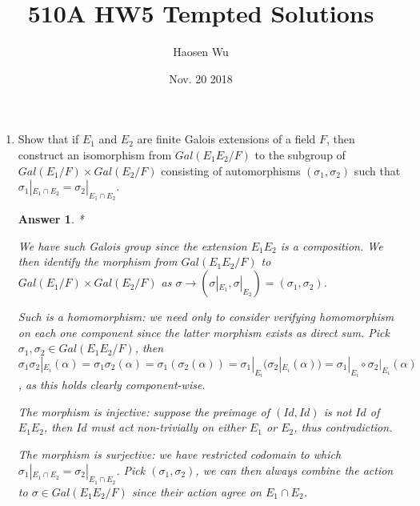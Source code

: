 \documentclass[11pt,leqno]{article}
\newcommand{\<}[1]{{\langle}#1 {\rangle}}
\theoremstyle{plain}
\newtheorem*{answer*}{Answer}
\theoremstyle{definition}
\theoremstyle{remark}
\numberwithin{equation}{section}
\begin{document}
\pagestyle{fancy}
\renewcommand{\sectionmark}[1]{\markright{\thesection\ #1}}
\fancyhead{}
\fancyhead[LO,R]{\bfseries\footnotesize\thepage}
\fancyhead[LE]{\bfseries\footnotesize\rightmark}
\fancyhead[RO]{\bfseries\footnotesize\rightmark}
\chead[]{}
\cfoot[]{}
\setlength{\headheight}{1cm}

\author{Haosen Wu}
\title{{\bf 510A HW5 Tempted Solutions}}
\date{Nov. 20 2018}

\maketitle
\begin{enumerate}

\item Show that if $E_1$ and $E_2$ are finite Galois extensions of a field $F$, then construct an isomorphism from $Gal(E_1E_2/F)$ to the subgroup of $Gal(E_1/F) \times Gal(E_2/F)$ consisting of automorphisms $(\sigma_1,\sigma_2)$ such that $\sigma_1 |_{E_1 \cap E_2} = \sigma_2|_{E_1 \cap E_2}$. 

\begin{answer*}*

    We have such Galois group since the extension $E_1E_2$ is a composition. We then identify the morphism from $Gal(E_1E_2/F)$ to $Gal(E_1/F) \times Gal(E_2/F)$ as $\sigma \rightarrow (\sigma |_{E_1}, \sigma |_{E_2})=(\sigma_1, \sigma_2)$. 
    
    Such is a homomorphism: we need only to consider verifying homomorphism on each one component since the latter morphism exists as direct sum. Pick $\sigma_1, \sigma_2 \in Gal(E_1E_2/F)$, then $\sigma_1\sigma_2 |_{E_i}(\alpha)=\sigma_1\sigma_2 {}(\alpha)=\sigma_1(\sigma_2 {}(\alpha))=\sigma_1 |_{E_i}(\sigma_2 |_{E_i}(\alpha))=\sigma_1 |_{E_i}\circ \sigma_2 |_{E_i}(\alpha)$, as this holds clearly component-wise. 
    
    The morphism is injective: suppose the preimage of $(Id,Id)$ is not $Id$ of $E_1E_2$, then $Id$ must act non-trivially on either $E_1$ or $E_2$, thus contradiction. 
    
    The morphism is surjective: we have restricted codomain to which $\sigma_1 |_{E_1 \cap E_2} = \sigma_2|_{E_1 \cap E_2}$. Pick $(\sigma_1,\sigma_2)$, we can then always combine the action to  $\sigma \in Gal(E_1E_2/F)$ since their action agree on  $E_1 \cap E_2$. 
\end{answer*}



\end{enumerate}
\end{document}
